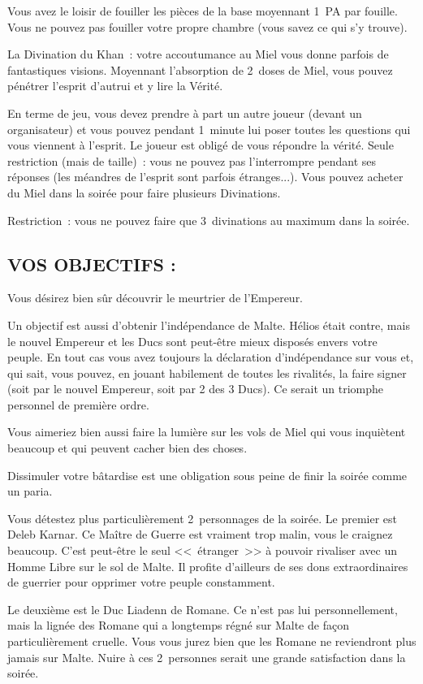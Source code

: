 \documentclass[14pt,twocolumn]{extarticle}
\begin{document}
Vous avez le loisir de fouiller les pièces de la base moyennant 1~PA par
fouille. Vous ne pouvez pas fouiller votre propre chambre
(vous savez ce qui s'y trouve).

La Divination du Khan~: votre accoutumance au Miel vous donne parfois de
fantastiques visions. Moyennant l'absorption de 2~doses de Miel, vous pouvez
pénétrer l'esprit d'autrui et y lire la Vérité.

En terme de jeu, vous devez prendre à part un autre joueur (devant un
organisateur) et vous pouvez pendant 1~minute lui poser toutes les questions
qui vous viennent à l'esprit. Le joueur est obligé de vous répondre la vérité.
Seule restriction (mais de taille)~: vous ne pouvez pas l'interrompre pendant
ses réponses (les méandres de l'esprit sont parfois étranges...). Vous pouvez
acheter du Miel dans la soirée pour faire plusieurs Divinations.

Restriction~: vous ne pouvez faire que 3~divinations au maximum dans la soirée.

\subsection{VOS OBJECTIFS :}

Vous désirez bien sûr découvrir le meurtrier de l'Empereur. 

Un objectif est aussi d'obtenir l'indépendance de Malte. Hélios était contre,
mais le nouvel Empereur et les Ducs sont peut-être mieux disposés envers votre
peuple. En tout cas vous avez toujours la déclaration d'indépendance sur vous
et, qui sait, vous pouvez, en jouant habilement de toutes les rivalités, la
faire signer (soit par le nouvel Empereur, soit par 2 des 3 Ducs). Ce serait un
triomphe personnel de première ordre.

Vous aimeriez bien aussi faire la lumière sur les vols de Miel qui vous
inquiètent beaucoup et qui peuvent cacher bien des choses.

Dissimuler votre bâtardise est une obligation sous peine de finir la soirée
comme un paria.

Vous détestez plus particulièrement 2~personnages de la soirée. Le premier est
Deleb Karnar. Ce Maître de Guerre est vraiment trop malin, vous le craignez
beaucoup. C'est peut-être le seul <<~étranger~>> à pouvoir rivaliser avec un
Homme Libre sur le sol de Malte. Il profite d'ailleurs de ses dons
extraordinaires de guerrier pour opprimer votre peuple constamment.

Le deuxième est le Duc Liadenn de Romane. Ce n'est pas lui personnellement,
mais la lignée des Romane qui a longtemps régné sur Malte de façon
particulièrement cruelle. Vous vous jurez bien que les Romane ne reviendront
plus jamais sur Malte. Nuire à ces 2~personnes serait une grande satisfaction
dans la soirée. 
\end{document}
